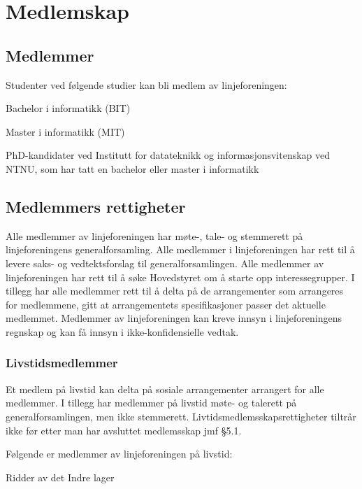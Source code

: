 \chapter{Medlemskap}\label{chapter:medlemskap}

\section{Medlemmer}{
\label{chap:medlemskap}
Studenter ved følgende studier kan bli medlem av linjeforeningen: 
\begin{liste}
	\item Bachelor i informatikk (BIT)
	\item Master i informatikk (MIT)
    \item PhD-kandidater ved Institutt for datateknikk og informasjonsvitenskap ved NTNU, som har tatt en bachelor eller master i informatikk
\end{liste} 
}
\section{Medlemmers rettigheter\newline}{
Alle medlemmer av linjeforeningen har møte-, tale- og stemmerett på linjeforeningens generalforsamling. Alle medlemmer i linjeforeningen har rett til å levere saks- og vedtektsforslag til generalforsamlingen. Alle medlemmer av linjeforeningen har rett til å søke Hovedstyret om å starte opp interessegrupper. I tillegg har alle medlemmer rett til å delta på de arrangementer som arrangeres for medlemmene, gitt at arrangementets spesifikasjoner passer det aktuelle medlemmet. Medlemmer av linjeforeningen kan kreve innsyn i linjeforeningens regnskap og kan få innsyn i ikke-konfidensielle vedtak. 
}

\subsection{Livstidsmedlemmer}{
Et medlem på livstid kan delta på sosiale arrangementer arrangert for alle medlemmer. I tillegg har medlemmer på livstid møte- og talerett på generalforsamlingen, men ikke stemmerett. Livtidsmedlemsskapsrettigheter tiltrår ikke før etter man har avsluttet medlemsskap jmf §5.1.

Følgende er medlemmer av linjeforeningen på livstid:
\begin{liste}
	\item Ridder av det Indre lager
\end{liste}

}
